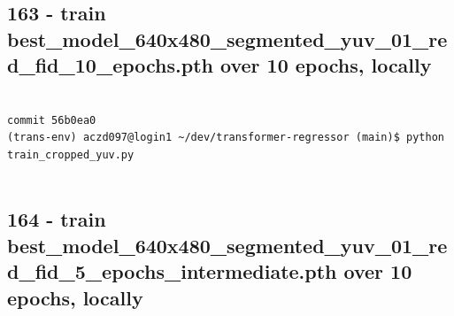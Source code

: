 \subsection{163 - train best\_model\_640x480\_segmented\_yuv\_01\_red\_fid\_10\_epochs.pth over 10 epochs, locally}
\label{app_res:163}

\begin{verbatim}

commit 56b0ea0
(trans-env) aczd097@login1 ~/dev/transformer-regressor (main)$ python train_cropped_yuv.py


\end{verbatim}

\subsection{164 - train best\_model\_640x480\_segmented\_yuv\_01\_red\_fid\_5\_epochs\_intermediate.pth over 10 epochs, locally}
\label{app_res:164}

